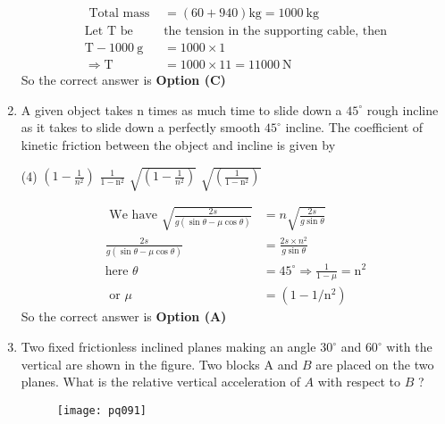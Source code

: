 \begin{enumerate}[label=\color{ocre}\textbf{\arabic*.}]
\begin{answer}
		\begin{align*}
		\text{	Total mass }&=(60+940) \mathrm{kg}=1000 \mathrm{~kg}\\
		\text{Let $\mathrm{T}$ be }&\text{the tension in the supporting cable, then}\\
		\mathrm{T}-1000 \mathrm{~g}&=1000 \times 1\\
		\Rightarrow \mathrm{T}&=1000 \times 11=11000 \mathrm{~N}
		\end{align*}
		So the correct answer is \textbf{Option (C)}
	\end{answer}
	\item A given object takes $\mathrm{n}$ times as much time to slide down a $45^{\circ}$ rough incline as it takes to slide down a perfectly smooth $45^{\circ}$ incline. The coefficient of kinetic friction between the object and incline is given by
	\begin{tasks}(4)
		\task[\textbf{A.}]$\left(1-\frac{1}{n^{2}}\right)$
		\task[\textbf{B.}] $\frac{1}{1-\mathrm{n}^{2}}$
		\task[\textbf{C.}] $\sqrt{\left(1-\frac{1}{n^{2}}\right)}$
		\task[\textbf{D.}] $\sqrt{\left(\frac{1}{1-\mathrm{n}^{2}}\right)}$
	\end{tasks}
	\begin{answer}
		\begin{align*}
		\text{	We have }\sqrt{\frac{2 s}{g(\sin \theta-\mu \cos \theta)}}&=n \sqrt{\frac{2 s}{g \sin \theta}}\\
		\frac{2 s}{g(\sin \theta-\mu \cos \theta)}&=\frac{2 s \times n^{2}}{g \sin \theta}\\
		\text{here }\theta&=45^{\circ} \Rightarrow \frac{1}{1-\mu}=\mathrm{n}^{2}\\ \text{ or } \mu&=\left(1-1 / \mathrm{n}^{2}\right)
		\end{align*}
		So the correct answer is \textbf{Option (A)}
	\end{answer}
	\item Two fixed frictionless inclined planes making an angle $30^{\circ}$ and $60^{\circ}$ with the vertical are shown in the figure. Two blocks A and $B$ are placed on the two planes. What is the relative vertical acceleration of $A$ with respect to $B$ ?
	\begin{figure}[H]
		\centering
		\texttt{[image: pq091]}
	\end{figure}
	

\end{enumerate}
